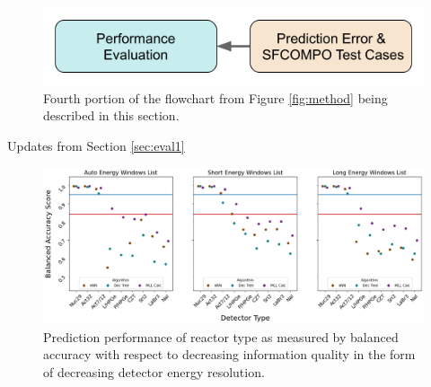 
\begin{figure}[H]
  \centering
  \includegraphics[width=0.7\linewidth]{./chapters/exp1/methodology4.png}
  \caption{Fourth portion of the flowchart from Figure \ref{fig:method} being 
           described in this section.}
\end{figure}

Updates from Section \ref{sec:eval1}

\begin{figure}[!htb]
  \centering
  \includegraphics[width=\textwidth]{./chapters/exp2/detector_preds_wrt_enlist_BalAcc_rxtr.png}
  \caption{Prediction performance of reactor type as measured by balanced accuracy
           with respect to decreasing information quality in the form of decreasing
           detector energy resolution.}
  \label{fig:rxtr}
\end{figure}

